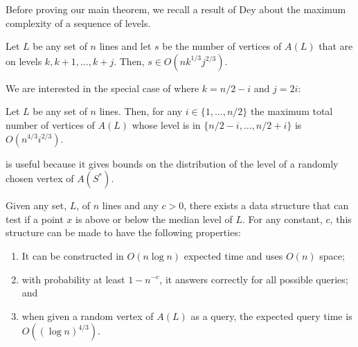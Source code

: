 \documentclass{cccg12}
\begin{document}
Before proving our main theorem, we recall a result of Dey
\cite[Theorem~4.2]{d98} about the maximum complexity of a sequence
of levels.

\begin{lem}
 Let $L$ be any set of $n$ lines and let $s$ be the number of vertices
 of $A(L)$ that are on levels $k,k+1,\ldots,k+j$.  Then, $s \in
 O(nk^{1/3}j^{2/3})$.
\end{lem}

We are interested in the special case of  where $k=n/2-i$
and $j=2i$:

\begin{cor}
  Let $L$ be any set of $n$ lines.  Then, for any $i\in\{1,\ldots,n/2\}$
  the maximum total number of vertices of $A(L)$ whose level is in
  $\{n/2-i,\ldots,n/2+i\}$ is $O(n^{4/3}i^{2/3})$.
\end{cor}

 is useful because it gives bounds on the distribution of
the level of a randomly chosen vertex of $A(S^*)$.

\begin{thm}
  Given any set, $L$, of $n$ lines and any $c>0$, there exists a data
  structure that can test if a point $x$ is above or below the median
  level of $L$.  For any constant, $c$, this structure can be made to
  have the following properties:
  \begin{enumerate}\setlength{\itemsep}{0mm}
    \item It can be constructed in
       $O(n\log n)$ expected time and uses $O(n)$ space;
    \item with probability
       at least $1-n^{-c}$, it answers correctly for all
       possible queries; and
    \item when given a random vertex of $A(L)$
       as a query, the expected query time is $O((\log n)^{4/3})$.
  \end{enumerate}
\end{thm}
\end{document}

